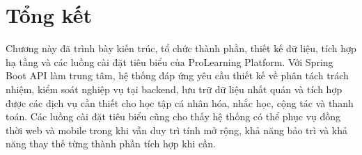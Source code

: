 \section{Tổng kết}
\label{sec:chapter3-summary}

Chương này đã trình bày kiến trúc, tổ chức thành phần, thiết kế dữ liệu, tích hợp hạ tầng và các luồng cài đặt tiêu biểu của ProLearning Platform. Với Spring Boot API làm trung tâm, hệ thống đáp ứng yêu cầu thiết kế về phân tách trách nhiệm, kiểm soát nghiệp vụ tại backend, lưu trữ dữ liệu nhất quán và tích hợp được các dịch vụ cần thiết cho học tập cá nhân hóa, nhắc học, cộng tác và thanh toán. Các luồng cài đặt tiêu biểu cũng cho thấy hệ thống có thể phục vụ đồng thời web và mobile trong khi vẫn duy trì tính mở rộng, khả năng bảo trì và khả năng thay thế từng thành phần tích hợp khi cần.